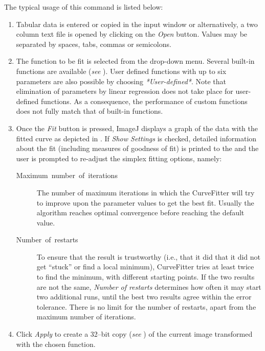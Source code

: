 The typical usage of this command is listed below:
\begin{enumerate}
\item Tabular data is entered or copied in the input window or alternatively,
a two column text file is opened by clicking on the \emph{Open} button.
Values may be separated by spaces, tabs, commas or semicolons.
\item The function to be fit is selected from the drop-down menu. Several
built-in functions are available (\emph{see} ).
User defined functions with up to six parameters are also possible
by choosing \emph{{*}User-defined{*}}. Note that elimination of parameters
by linear regression does not take place for user-defined functions.
As a consequence, the performance of custom functions does not fully
match that of built-in functions.
\item Once the \emph{Fit} button is pressed, ImageJ displays a graph of
the data with the fitted curve as depicted in .
If \emph{Show Settings }is checked, detailed information about the
fit (including measures of goodness of fit) is printed to the 
and the user is prompted to re-adjust the simplex fitting options,
namely:

\begin{description}
\item [{Maximum\ number\ of\ iterations}] The number of maximum iterations
in which the CurveFitter will try to improve upon the parameter values
to get the best fit. Usually the algorithm reaches optimal convergence
before reaching the default value.
\item [{Number\ of\ restarts}] To ensure that the result is trustworthy
(i.e., that it did that it did not get ``stuck'' or find a local
minimum), CurveFitter tries at least twice to find the minimum, with
different starting points. If the two results are not the same, \emph{Number
of restarts} determines how often it may start two additional runs,
until the best two results agree within the error tolerance. There
is no limit for the number of restarts, apart from the maximum number
of iterations.
\end{description}
\item Click \emph{Apply} to create a 32--bit copy (\emph{see} )
of the current image transformed with the chosen function.
\end{enumerate}
